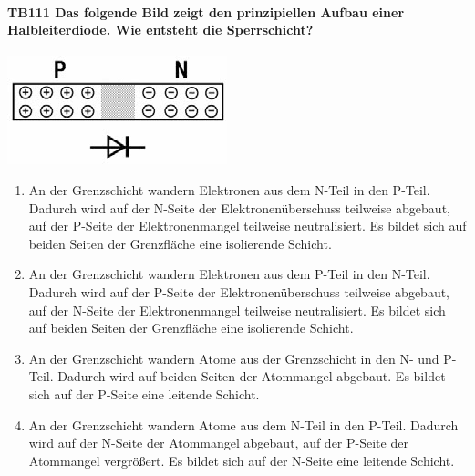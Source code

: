 \documentclass[8pt]{article}
\begin{document}
\begin{enumerate}
\paragraph*{TB111 Das folgende Bild zeigt den prinzipiellen Aufbau einer Halbleiterdiode. Wie entsteht die Sperrschicht?}
\begin{center}
	\begin{minipage}{\linewidth}
		\centering
		\includegraphics[scale=0.7]{pics/tb111_a.jpg}

	\end{minipage}
\end{center}
\begin{enumerate}[nolistsep,label=\Alph*]
\item An der Grenzschicht wandern Elektronen aus dem N-Teil in den P-Teil. Dadurch wird auf der N-Seite der Elektronenüberschuss teilweise abgebaut, auf der P-Seite der Elektronenmangel teilweise neutralisiert. Es bildet sich auf beiden Seiten der Grenzfläche eine isolierende Schicht.
\item An der Grenzschicht wandern Elektronen aus dem P-Teil in den N-Teil. Dadurch wird auf der P-Seite der Elektronenüberschuss teilweise abgebaut, auf der N-Seite der Elektronenmangel teilweise neutralisiert. Es bildet sich auf beiden Seiten der Grenzfläche eine isolierende Schicht.
\item An der Grenzschicht wandern Atome aus der Grenzschicht in den N- und P-Teil. Dadurch wird auf beiden Seiten der Atommangel abgebaut. Es bildet sich auf der P-Seite eine leitende Schicht. 
\item An der Grenzschicht wandern Atome aus dem N-Teil in den P-Teil. Dadurch wird auf der N-Seite der Atommangel abgebaut, auf der P-Seite der Atommangel vergrößert. Es bildet sich auf der N-Seite eine leitende Schicht.
\end{enumerate}




\end{enumerate}
\end{document}
